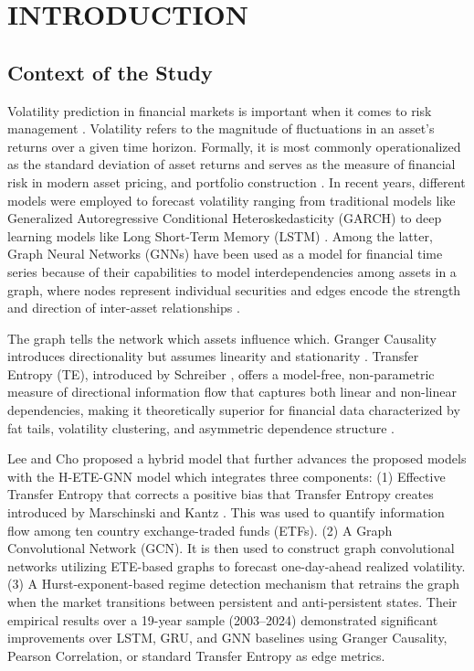 \documentclass[12pt,oneside]{report}
\begin{document}
\chapter{INTRODUCTION}\label{ch:intro}

\section{Context of the Study}

Volatility prediction in financial markets is important when it comes to
risk management \cite{andersen2003,engle2004}. Volatility refers to the
magnitude of fluctuations in an asset's returns over a given time
horizon. Formally, it is most commonly operationalized as the standard
deviation of asset returns and serves as the measure of financial risk
in modern asset pricing, and portfolio construction
\cite{andersen2003,engle2004}. In recent years, different models were
employed to forecast volatility ranging from traditional models like
Generalized Autoregressive Conditional Heteroskedasticity (GARCH)
\cite{bollerslev1986} to deep learning models like Long Short-Term
Memory (LSTM) \cite{hochreiter1997}. Among the latter, Graph Neural
Networks (GNNs) have been used as a model for financial time series
because of their capabilities to model interdependencies among assets in
a graph, where nodes represent individual securities and edges encode
the strength and direction of inter-asset relationships \cite{chen2023}.

The graph tells the network which assets influence which. Granger
Causality introduces directionality but assumes linearity and
stationarity \cite{granger1969}. Transfer Entropy (TE), introduced by
Schreiber \cite{schreiber2000}, offers a model-free, non-parametric
measure of directional information flow that captures both linear and
non-linear dependencies, making it theoretically superior for financial
data characterized by fat tails, volatility clustering, and asymmetric
dependence structure \cite{behrendt2019}.

Lee and Cho \cite{lee2025} proposed a hybrid model that further advances
the proposed models with the H-ETE-GNN model which integrates three
components: (1) Effective Transfer Entropy that corrects a positive bias
that Transfer Entropy creates introduced by Marschinski and Kantz
\cite{marschinski2002}. This was used to quantify information flow among
ten country exchange-traded funds (ETFs). (2) A Graph Convolutional
Network (GCN). It is then used to construct graph convolutional networks
utilizing ETE-based graphs to forecast one-day-ahead realized
volatility. (3) A Hurst-exponent-based regime detection mechanism that
retrains the graph when the market transitions between persistent and
anti-persistent states. Their empirical results over a 19-year sample
(2003--2024) demonstrated significant improvements over LSTM, GRU, and
GNN baselines using Granger Causality, Pearson Correlation, or standard
Transfer Entropy as edge metrics.
\end{document}
